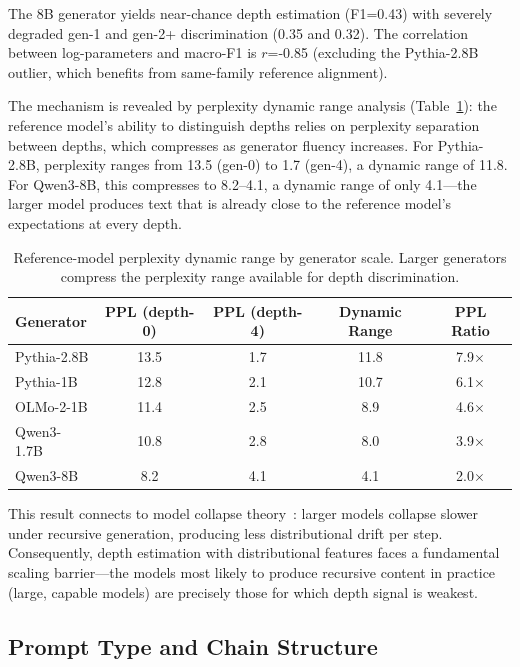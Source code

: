\documentclass[11pt]{article}
\begin{document}
The 8B generator yields near-chance depth estimation (F1=0.43) with severely degraded gen-1 and gen-2+ discrimination (0.35 and 0.32).
The correlation between log-parameters and macro-F1 is $r$=-0.85 (excluding the Pythia-2.8B outlier, which benefits from same-family reference alignment).

The mechanism is revealed by perplexity dynamic range analysis (Table~\ref{tab:ppl_range}): the reference model's ability to distinguish depths relies on perplexity separation between depths, which compresses as generator fluency increases.
For Pythia-2.8B, perplexity ranges from 13.5 (gen-0) to 1.7 (gen-4), a dynamic range of 11.8.
For Qwen3-8B, this compresses to 8.2--4.1, a dynamic range of only 4.1---the larger model produces text that is already close to the reference model's expectations at every depth.

\begin{table}[h]
\centering
\caption{Reference-model perplexity dynamic range by generator scale. Larger generators compress the perplexity range available for depth discrimination.}
\label{tab:ppl_range}
\begin{tabular}{lcccc}
\toprule
Generator & PPL (depth-0) & PPL (depth-4) & Dynamic Range & PPL Ratio \\
\midrule
Pythia-2.8B & 13.5 & 1.7 & 11.8 & 7.9$\times$ \\
Pythia-1B & 12.8 & 2.1 & 10.7 & 6.1$\times$ \\
OLMo-2-1B & 11.4 & 2.5 & 8.9 & 4.6$\times$ \\
Qwen3-1.7B & 10.8 & 2.8 & 8.0 & 3.9$\times$ \\
Qwen3-8B & 8.2 & 4.1 & 4.1 & 2.0$\times$ \\
\bottomrule
\end{tabular}
\end{table}

This result connects to model collapse theory~\citep{gerstgrasser2024model}: larger models collapse slower under recursive generation, producing less distributional drift per step.
Consequently, depth estimation with distributional features faces a fundamental scaling barrier---the models most likely to produce recursive content in practice (large, capable models) are precisely those for which depth signal is weakest.

\subsection{Prompt Type and Chain Structure}
\label{sec:prompt_type}
\end{document}
